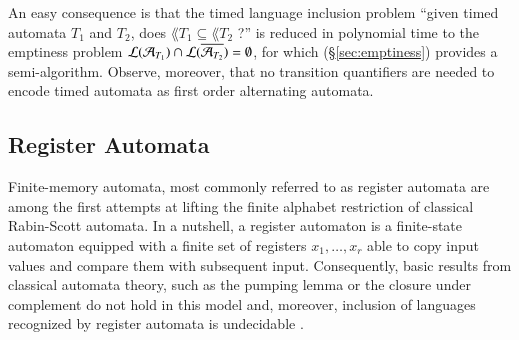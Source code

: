 An easy consequence is that the timed language inclusion problem
``given timed automata $T_1$ and $T_2$, does $\lang{T_1} \subseteq
\lang{T_2}$ ?'' is reduced in polynomial time to the emptiness problem
${\mathcal L}({\mathcal{A}_{T_1}}) \cap {\mathcal L}({\overline{\mathcal{A}_{T_2}}}) = \emptyset$, for
which (\S\ref{sec:emptiness}) provides a semi-algorithm. Observe,
moreover, that no transition quantifiers are needed to encode timed
automata as first order alternating automata.

\subsection{Register Automata}
\label{sec:ra}

Finite-memory automata, most commonly referred to as register automata
\cite{KaminskiFrancez94} are among the first attempts at lifting the
finite alphabet restriction of classical Rabin-Scott automata. In a
nutshell, a register automaton is a finite-state automaton equipped
with a finite set of registers $x_1,\ldots,x_r$ able to copy input
values and compare them with subsequent input. Consequently, basic
results from classical automata theory, such as the pumping lemma or
the closure under complement do not hold in this model and, moreover,
inclusion of languages recognized by register automata is undecidable
\cite{NevenSchwentickVianu03}.

